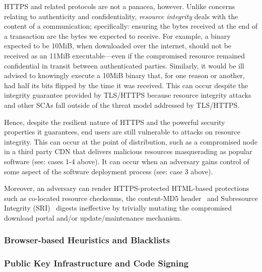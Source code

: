 HTTPS and related protocols are not a panacea, however. Unlike concerns relating
to authenticity and confidentiality, \textit{resource integrity} deals with the
content of a communication; specifically: ensuring the bytes received at the end
of a transaction are the bytes we expected to receive. For example, a binary
expected to be 10MiB, when downloaded over the internet, should not be received
as an 11MiB executable---even if the compromised resource remained confidential
in transit between authenticated parties. Similarly, it would be ill advised to
knowingly execute a 10MiB binary that, for one reason or another, had half its
bits flipped by the time it was received. This can occur despite the integrity
guarantee provided by TLS/HTTPS because resource integrity attacks and other
SCAs fall outside of the threat model addressed by TLS/HTTPS.

Hence, despite the resilient nature of HTTPS and the powerful security
properties it guarantees, end users are still vulnerable to attacks on resource
integrity. This can occur at the point of distribution, such as a compromised
node in a third party CDN that delivers malicious resources masquerading as
popular software (see: cases 1-4 above). It can occur when an adversary gains
control of some aspect of the software deployment process (see: case 3 above).

Moreover, an adversary can render HTTPS-protected HTML-based protections such as
co-located resource checksums, the content-MD5 header~\cite{MD5Header} and
Subresource Integrity (SRI)~\cite{SRI} digests ineffective by trivially mutating
the compromised download portal and/or update/maintenance mechanism.

\subsubsection{Browser-based Heuristics and Blacklists}



\subsubsection{Public Key Infrastructure and Code Signing}

~\cite{DANE1, DANE2, DANE3, OpenPGP1}




